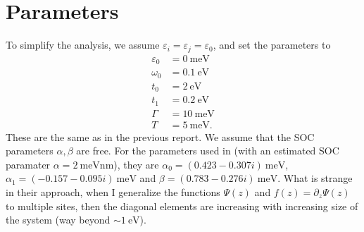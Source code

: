 \documentclass{article}
\newcommand{\exP}[1]{\mathrm{e}^{#1}}
\begin{document}
\section{Parameters}
To simplify the analysis, we assume $\varepsilon_i = \varepsilon_j = \varepsilon_0$, and set the parameters to
\begin{align*}
	\varepsilon_0 &= \SI{0}{\milli\electronvolt}\\
	\omega_0 &= \SI{0.1}{\electronvolt}\\
	t_0 &= \SI{2}{\electronvolt}\\
	t_1 &= \SI{0.2}{\electronvolt}\\
	\Gamma &= \SI{10}{\milli\electronvolt}\\
	T &= \SI{5}{\milli\electronvolt}.
\end{align*}
These are the same as in the previous report. We assume that the SOC parameters $\alpha,\beta$ are free. 
For the parameters used in \cite{Gutierrez_Díaz_Naaman_Cuniberti_2012} (with an estimated SOC paramater $\alpha=\SI{2}{\milli\electronvolt \nano\meter}$), they are  $\alpha_0 = (0.423-0.307i) \SI{}{\milli\electronvolt}$, $\alpha_1 = (-0.157-0.095i)\SI{}{\milli\electronvolt}$ and $\beta = (0.783-0.276i)\SI{}{\milli\electronvolt}$. What is strange in their approach, when I generalize the functions $\Psi(z)$ and $f(z) = \partial_z \Psi(z)$ to multiple sites, then the diagonal elements are increasing with increasing size of the system (way beyond $\sim\SI{1}{\electronvolt}$).
\end{document}
